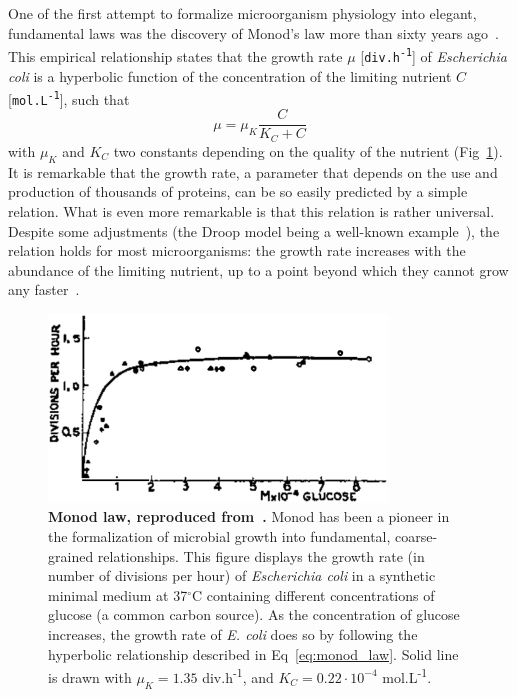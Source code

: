One of the first attempt to formalize microorganism physiology into elegant, fundamental laws was the discovery of Monod's law more than sixty years ago~\cite{monod_growth_1949}.
This empirical relationship states that the growth rate $\mu$ [\texttt{div.h\textsuperscript{-1}}] of \textit{Escherichia coli} is a hyperbolic function of the concentration of the limiting nutrient $C$ [\texttt{mol.L\textsuperscript{-1}}], such that
\begin{equation}
\label{eq:monod_law}
\mu = \mu_K \frac{C}{K_C + C}
\end{equation}
with $\mu_K$ and $K_C$ two constants depending on the quality of the nutrient (Fig~\ref{fig:monod_law}).
It is remarkable that the growth rate, a parameter that depends on the use and production of thousands of proteins, can be so easily predicted by a simple relation.
What is even more remarkable is that this relation is rather universal.
Despite some adjustments (the Droop model being a well-known example~\cite{droop_thoughts_1973}), the relation holds for most microorganisms: the growth rate increases with the abundance of the limiting nutrient, up to a point beyond which they cannot grow any faster~\cite{koch_why_1988}.

\begin{figure}[tb]
\centering
\includegraphics[height=5cm]{./Fig/Chapter1/monod_law.eps}
\caption{
\textbf{Monod law, reproduced from~\cite{monod_growth_1949}.}
Monod has been a pioneer in the formalization of microbial growth into fundamental, coarse-grained relationships.
This figure displays the growth rate (in number of divisions per hour) of \textit{Escherichia coli} in a synthetic minimal medium at 37$^{\circ}$C containing different concentrations of glucose (a common carbon source).
As the concentration of glucose increases, the growth rate of \textit{E. coli} does so by following the hyperbolic relationship described in Eq~\ref{eq:monod_law}.
Solid line is drawn with $\mu_K = 1.35$ div.h\textsuperscript{-1}, and $K_C = 0.22 \cdot 10^{-4}$ mol.L\textsuperscript{-1}.
}
\label{fig:monod_law}
\end{figure}

